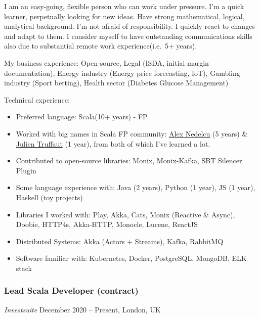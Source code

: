 \documentclass[
]{rss}
\author{}
\date{}
\providecommand{\tightlist}{%
  \setlength{\itemsep}{0pt}\setlength{\parskip}{0pt}}
\begin{document}
\address{\\[-9pt] mihai.soloi@gmail.com | +44 (0) 7706074771 | https://www.linkedin.com/in/mihaisoloi}
\begin{resume}

I am an easy-going, flexible person who can work under pressure. I'm a
quick learner, perpetually looking for new ideas. Have strong
mathematical, logical, analytical background. I'm not afraid of
responsibility. I quickly react to changes and adapt to them. I consider
myself to have outstanding communications skills also due to substantial
remote work experience(i.e.~5+ years).

My business experience: Open-source, Legal (ISDA, initial margin
documentation), Energy industry (Energy price forecasting, IoT),
Gambling industry (Sport betting), Health sector (Diabetes Glucose
Management)

Technical experience:

\begin{itemize}
\tightlist
\item
  Preferred language: Scala(10+ years) - FP.
\item
  Worked with big names in Scala FP community:
  \href{https://monix.io}{Alex Nedelcu} (5 years) \&
  \href{https://julien-truffaut.github.io/Monocle}{Julien Truffaut} (1
  year), from both of which I've learned a lot.
\item
  Contributed to open-source libraries: Monix, Monix-Kafka, SBT Silencer
  Plugin
\item
  Some language experience with: Java (2 years), Python (1 year), JS (1
  year), Haskell (toy projects)
\item
  Libraries I worked with: Play, Akka, Cats, Monix (Reactive \& Async),
  Doobie, HTTP4s, Akka-HTTP, Monocle, Lucene, ReactJS
\item
  Distributed Systems: Akka (Actors + Streams), Kafka, RabbitMQ
\item
  Software familiar with: Kubernetes, Docker, PostgreSQL, MongoDB, ELK
  stack
\end{itemize}

\hypertarget{lead-scala-developer-contract}{%
\subsubsection{Lead Scala Developer
(contract)}\label{lead-scala-developer-contract}}

\emph{Investsuite} December 2020 -- Present, London, UK


\end{resume}
\end{document}
